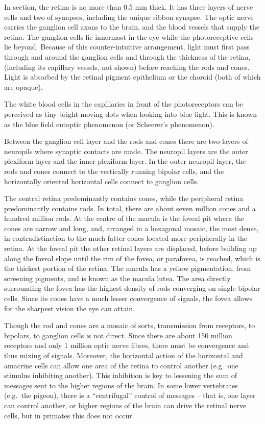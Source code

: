 In section, the retina is no more than 0.5 mm thick. It has three layers of nerve cells and two of synapses, including the unique ribbon synapse. The optic nerve carries the ganglion cell axons to the brain, and the blood vessels that supply the retina. The ganglion cells lie innermost in the eye while the photoreceptive cells lie beyond. Because of this counter-intuitive arrangement, light must first pass through and around the ganglion cells and through the thickness of the retina, (including its capillary vessels, not shown) before reaching the rods and cones. Light is absorbed by the retinal pigment epithelium or the choroid (both of which are opaque).

The white blood cells in the capillaries in front of the photoreceptors can be perceived as tiny bright moving dots when looking into blue light. This is known as the blue field entoptic phenomenon (or Scheerer's phenomenon).

Between the ganglion cell layer and the rods and cones there are two layers of neuropils where synaptic contacts are made. The neuropil layers are the outer plexiform layer and the inner plexiform layer. In the outer neuropil layer, the rods and cones connect to the vertically running bipolar cells, and the horizontally oriented horizontal cells connect to ganglion cells.

The central retina predominantly contains cones, while the peripheral retina predominantly contains rods. In total, there are about seven million cones and a hundred million rods. At the centre of the macula is the foveal pit where the cones are narrow and long, and, arranged in a hexagonal mosaic, the most dense, in contradistinction to the much fatter cones located more peripherally in the retina. At the foveal pit the other retinal layers are displaced, before building up along the foveal slope until the rim of the fovea, or parafovea, is reached, which is the thickest portion of the retina. The macula has a yellow pigmentation, from screening pigments, and is known as the macula lutea. The area directly surrounding the fovea has the highest density of rods converging on single bipolar cells. Since its cones have a much lesser convergence of signals, the fovea allows for the sharpest vision the eye can attain.

Though the rod and cones are a mosaic of sorts, transmission from receptors, to bipolars, to ganglion cells is not direct. Since there are about 150 million receptors and only 1 million optic nerve fibres, there must be convergence and thus mixing of signals. Moreover, the horizontal action of the horizontal and amacrine cells can allow one area of the retina to control another (e.g.~one stimulus inhibiting another). This inhibition is key to lessening the sum of messages sent to the higher regions of the brain. In some lower vertebrates (e.g.~the pigeon), there is a ``centrifugal'' control of messages -- that is, one layer can control another, or higher regions of the brain can drive the retinal nerve cells, but in primates this does not occur.

